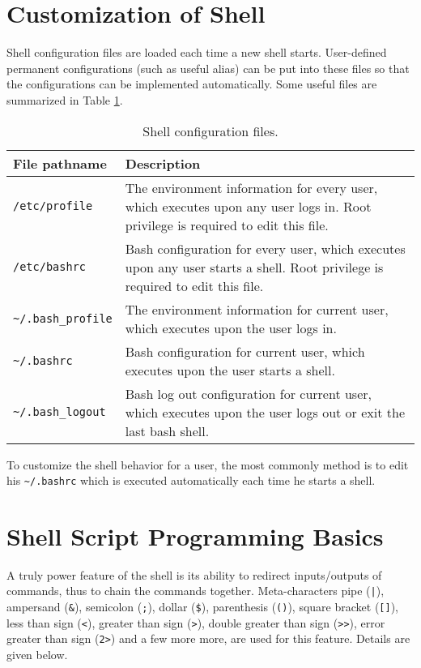 \section{Customization of Shell} \label{ch:sb:subsec:customizeshell}

Shell configuration files are loaded each time a new shell starts. User-defined permanent configurations (such as useful alias) can be put into these files so that the configurations can be implemented automatically. Some useful files are summarized in Table \ref{ch:sb:tab:shellconfig}.

\begin{table}
	\centering \caption{Shell configuration files.}\label{ch:sb:tab:shellconfig}
	\begin{tabularx}{\textwidth}{lX}
		\hline
		File pathname & Description \\ \hline
		\verb|/etc/profile| & The environment information for every user, which executes upon any user logs in. Root privilege is required to edit this file.  \\ 
		\verb|/etc/bashrc| & Bash configuration for every user, which executes upon any user starts a shell. Root privilege is required to edit this file. \\ 
		\verb|~/.bash_profile| & The environment information for current user, which executes upon the user logs in. \\ 
		\verb|~/.bashrc| & Bash configuration for current user, which executes upon the user starts a shell. \\ 
		\verb|~/.bash_logout| & Bash log out configuration for current user, which executes upon the user logs out or exit the last bash shell. \\ \hline
	\end{tabularx}
\end{table}

To customize the shell behavior for a user, the most commonly method is to edit his \verb|~/.bashrc| which is executed automatically each time he starts a shell.

\section{Shell Script Programming Basics}

A truly power feature of the shell is its ability to redirect inputs/outputs of commands, thus to chain the commands together. Meta-characters pipe (\verb?|?), ampersand (\verb|&|), semicolon (\verb|;|), dollar (\verb|$|), parenthesis (\verb|()|), square bracket (\verb|[]|), less than sign (\verb|<|), greater than sign (\verb|>|), double greater than sign (\verb|>>|), error greater than sign (\verb|2>|) and a few more more, are used for this feature. Details are given below.

